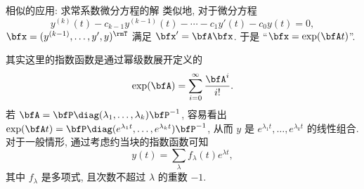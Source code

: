 \begin{frame}{相似的应用: 求常系数微分方程的解\noexer}
	\onslide<+->
	类似地, 对于微分方程
	\[y^{(k)}(t)-c_{k-1}y^{(k-1)}(t)-\cdots-c_1y'(t)-c_0y(t)=0,\]
	\onslide<+->
	$\bfx=(y^{(k-1)},\dots,y',y)^\rmT$ 满足 $\bfx'=\bfA\bfx$.
	\onslide<+->
	于是 ``$\bfx=\exp(\bfA t)$''.

	\onslide<+->
	其实这里的指数函数是通过幂级数展开定义的
	\[\exp(\bfA)=\sum_{i=0}^\infty\frac{\bfA^i}{i!}.\]
	\onslide<+->
	若 $\bfA=\bfP\diag(\lambda_1,\dots,\lambda_k)\bfP^{-1}$, 容易看出 $\exp(\bfA t)=\bfP\diag(e^{\lambda_1 t},\dots,e^{\lambda_k t})\bfP^{-1}$,
	\onslide<+->
	从而 $y$ 是 $e^{\lambda_1t},\dots,e^{\lambda_kt}$ 的线性组合.
	\onslide<+->
	对于一般情形, 通过考虑约当块的指数函数可知
	\[y(t)=\sum_\lambda f_\lambda(t)e^{\lambda t},\]
	其中 $f_\lambda$ 是多项式, 且次数不超过 $\lambda$ 的重数 $-1$.
\end{frame}

